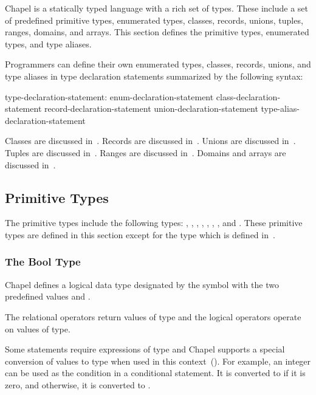 \label{Types}

Chapel is a statically typed language with a rich set of types.  These
include a set of predefined primitive types, enumerated types,
classes, records, unions, tuples, ranges, domains, and arrays.
This section defines the primitive types, enumerated types, and type
aliases.

Programmers can define their own enumerated types, classes, records,
unions, and type aliases in type declaration statements summarized by
the following syntax:
\begin{syntax}
type-declaration-statement:
  enum-declaration-statement
  class-declaration-statement
  record-declaration-statement
  union-declaration-statement
  type-alias-declaration-statement
\end{syntax}

Classes are discussed in~.  Records are discussed
in~.  Unions are discussed in~.  Tuples are
discussed in~.  Ranges are discussed in~.
Domains and arrays are discussed in~.


\subsection{Primitive Types}
\label{Primitive_Types}

The primitive types include the following
types: , , , ,
, , , and .
These primitive types are defined in this section except for
the  type which is defined in~.

\subsubsection{The Bool Type}
\label{The_Bool_Type}

Chapel defines a logical data type designated by the symbol
 with the two predefined values  and
.

The relational operators return values of  type and the
logical operators operate on values of  type.

Some statements require expressions of  type and Chapel
supports a special conversion of values to  type when used
in this context~().
For example, an integer can be used as the condition in a conditional
statement.  It is converted to  if it is zero, and
otherwise, it is converted to .

